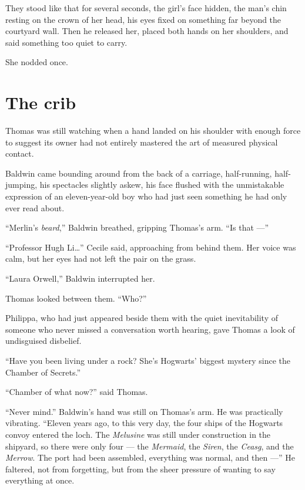They stood like that for several seconds, the girl's face hidden, the man's chin resting on the crown of her head, his eyes fixed on something far beyond the courtyard wall. Then he released her, placed both hands on her shoulders, and said something too quiet to carry.

She nodded once.

\section*{The crib}

Thomas was still watching when a hand landed on his shoulder with enough force to suggest its owner had not entirely mastered the art of measured physical contact.

Baldwin came bounding around from the back of a carriage, half-running, half-jumping, his spectacles slightly askew, his face flushed with the unmistakable expression of an eleven-year-old boy who had just seen something he had only ever read about.

\enquote{Merlin's \textit{beard},} Baldwin breathed, gripping Thomas's arm. \enquote{Is that ---}

\enquote{Professor Hugh Li\ldots{}} Cecile said, approaching from behind them. Her voice was calm, but her eyes had not left the pair on the grass.

\enquote{Laura Orwell,} Baldwin interrupted her.

Thomas looked between them. \enquote{Who?}

Philippa, who had just appeared beside them with the quiet inevitability of someone who never missed a conversation worth hearing, gave Thomas a look of undisguised disbelief.

\enquote{Have you been living under a rock? She's Hogwarts' biggest mystery since the Chamber of Secrets.}

\enquote{Chamber of what now?} said Thomas.

\enquote{Never mind.} Baldwin's hand was still on Thomas's arm. He was practically vibrating. \enquote{Eleven years ago, to this very day, the four ships of the Hogwarts convoy entered the loch. The \textit{Melusine} was still under construction in the shipyard, so there were only four --- the \textit{Mermaid}, the \textit{Siren}, the \textit{Ceasg}, and the \textit{Merrow}. The port had been assembled, everything was normal, and then ---} He faltered, not from forgetting, but from the sheer pressure of wanting to say everything at once.

